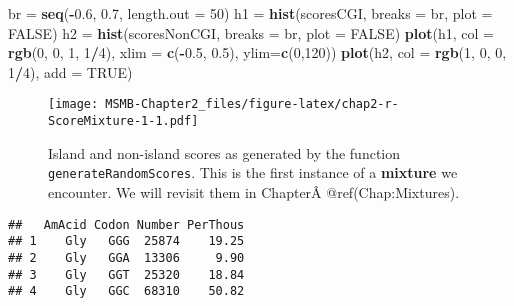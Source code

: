 \documentclass[]{article}
\newenvironment{Shaded}{\begin{snugshade}}{\end{snugshade}}
\newcommand{\KeywordTok}[1]{\textcolor[rgb]{0.13,0.29,0.53}{\textbf{#1}}}
\newcommand{\DataTypeTok}[1]{\textcolor[rgb]{0.13,0.29,0.53}{#1}}
\newcommand{\DecValTok}[1]{\textcolor[rgb]{0.00,0.00,0.81}{#1}}
\newcommand{\FloatTok}[1]{\textcolor[rgb]{0.00,0.00,0.81}{#1}}
\newcommand{\StringTok}[1]{\textcolor[rgb]{0.31,0.60,0.02}{#1}}
\newcommand{\OtherTok}[1]{\textcolor[rgb]{0.56,0.35,0.01}{#1}}
\newcommand{\OperatorTok}[1]{\textcolor[rgb]{0.81,0.36,0.00}{\textbf{#1}}}
\newcommand{\NormalTok}[1]{#1}
\begin{document}
\begin{Shaded}
\begin{Highlighting}[]
\NormalTok{br =}\StringTok{ }\KeywordTok{seq}\NormalTok{(}\OperatorTok{-}\FloatTok{0.6}\NormalTok{, }\FloatTok{0.7}\NormalTok{, }\DataTypeTok{length.out =} \DecValTok{50}\NormalTok{)}
\NormalTok{h1 =}\StringTok{ }\KeywordTok{hist}\NormalTok{(scoresCGI,    }\DataTypeTok{breaks =}\NormalTok{ br, }\DataTypeTok{plot =} \OtherTok{FALSE}\NormalTok{)}
\NormalTok{h2 =}\StringTok{ }\KeywordTok{hist}\NormalTok{(scoresNonCGI, }\DataTypeTok{breaks =}\NormalTok{ br, }\DataTypeTok{plot =} \OtherTok{FALSE}\NormalTok{)}
\KeywordTok{plot}\NormalTok{(h1, }\DataTypeTok{col =} \KeywordTok{rgb}\NormalTok{(}\DecValTok{0}\NormalTok{, }\DecValTok{0}\NormalTok{, }\DecValTok{1}\NormalTok{, }\DecValTok{1}\OperatorTok{/}\DecValTok{4}\NormalTok{), }\DataTypeTok{xlim =} \KeywordTok{c}\NormalTok{(}\OperatorTok{-}\FloatTok{0.5}\NormalTok{, }\FloatTok{0.5}\NormalTok{), }\DataTypeTok{ylim=}\KeywordTok{c}\NormalTok{(}\DecValTok{0}\NormalTok{,}\DecValTok{120}\NormalTok{))}
\KeywordTok{plot}\NormalTok{(h2, }\DataTypeTok{col =} \KeywordTok{rgb}\NormalTok{(}\DecValTok{1}\NormalTok{, }\DecValTok{0}\NormalTok{, }\DecValTok{0}\NormalTok{, }\DecValTok{1}\OperatorTok{/}\DecValTok{4}\NormalTok{), }\DataTypeTok{add =} \OtherTok{TRUE}\NormalTok{)}
\end{Highlighting}
\end{Shaded}

\begin{figure}
\centering
\texttt{[image: MSMB-Chapter2\_files/figure-latex/chap2-r-ScoreMixture-1-1.pdf]}
\caption{Island and non-island scores as generated by the function
\texttt{generateRandomScores}. This is the first instance of a
\textbf{mixture} we encounter. We will revisit them in ChapterÂ
@ref(Chap:Mixtures).}
\end{figure}

\begin{verbatim}
##   AmAcid Codon Number PerThous
## 1    Gly   GGG  25874    19.25
## 2    Gly   GGA  13306     9.90
## 3    Gly   GGT  25320    18.84
## 4    Gly   GGC  68310    50.82
\end{verbatim}

\begin{Shaded}
\end{Shaded}
\end{document}
